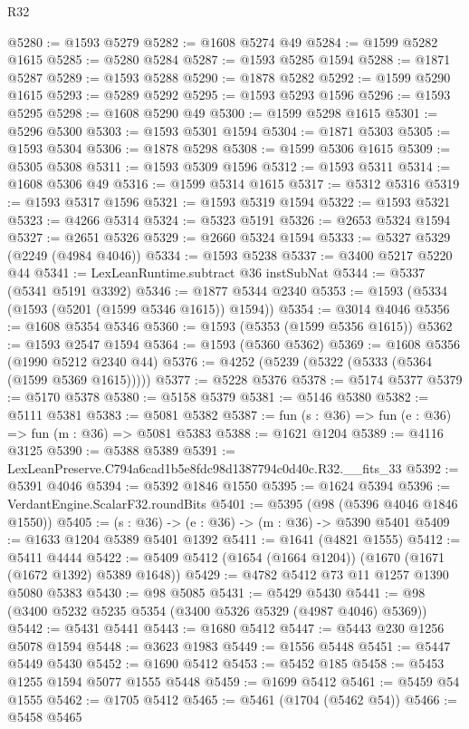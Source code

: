 \begin{lexlean}{R32}
\begin{coremodule}
@5280 := @1593 @5279
@5282 := @1608 @5274 @49
@5284 := @1599 @5282 @1615
@5285 := @5280 @5284
@5287 := @1593 @5285 @1594
@5288 := @1871 @5287
@5289 := @1593 @5288
@5290 := @1878 @5282
@5292 := @1599 @5290 @1615
@5293 := @5289 @5292
@5295 := @1593 @5293 @1596
@5296 := @1593 @5295
@5298 := @1608 @5290 @49
@5300 := @1599 @5298 @1615
@5301 := @5296 @5300
@5303 := @1593 @5301 @1594
@5304 := @1871 @5303
@5305 := @1593 @5304
@5306 := @1878 @5298
@5308 := @1599 @5306 @1615
@5309 := @5305 @5308
@5311 := @1593 @5309 @1596
@5312 := @1593 @5311
@5314 := @1608 @5306 @49
@5316 := @1599 @5314 @1615
@5317 := @5312 @5316
@5319 := @1593 @5317 @1596
@5321 := @1593 @5319 @1594
@5322 := @1593 @5321
@5323 := @4266 @5314
@5324 := @5323 @5191
@5326 := @2653 @5324 @1594
@5327 := @2651 @5326
@5329 := @2660 @5324 @1594
@5333 := @5327 @5329 (@2249 (@4984 @4046))
@5334 := @1593 @5238
@5337 := @3400 @5217 @5220 @44
@5341 := LexLeanRuntime.subtract @36 instSubNat
@5344 := @5337 (@5341 @5191 @3392)
@5346 := @1877 @5344 @2340
@5353 := @1593 (@5334 (@1593 (@5201 (@1599 @5346 @1615)) @1594))
@5354 := @3014 @4046
@5356 := @1608 @5354 @5346
@5360 := @1593 (@5353 (@1599 @5356 @1615))
@5362 := @1593 @2547 @1594
@5364 := @1593 (@5360 @5362)
@5369 := @1608 @5356 (@1990 @5212 @2340 @44)
@5376 := @4252 (@5239 (@5322 (@5333 (@5364 (@1599 @5369 @1615)))))
@5377 := @5228 @5376
@5378 := @5174 @5377
@5379 := @5170 @5378
@5380 := @5158 @5379
@5381 := @5146 @5380
@5382 := @5111 @5381
@5383 := @5081 @5382
@5387 := fun (s : @36) => fun (e : @36) => fun (m : @36) => @5081 @5383
@5388 := @1621 @1204
@5389 := @4116 @3125
@5390 := @5388 @5389
@5391 := LexLeanPreserve.C794a6cad1b5e8fdc98d1387794c0d40c.R32.__fits_33
@5392 := @5391 @4046
@5394 := @5392 @1846 @1550
@5395 := @1624 @5394
@5396 := VerdantEngine.ScalarF32.roundBits
@5401 := @5395 (@98 (@5396 @4046 @1846 @1550))
@5405 := (s : @36) -> (e : @36) -> (m : @36) -> @5390 @5401
@5409 := @1633 @1204 @5389 @5401 @1392
@5411 := @1641 (@4821 @1555)
@5412 := @5411 @4444
@5422 := @5409 @5412 (@1654 (@1664 @1204)) (@1670 (@1671 (@1672 @1392) @5389 @1648))
@5429 := @4782 @5412 @73 @11 @1257 @1390 @5080 @5383
@5430 := @98 @5085
@5431 := @5429 @5430
@5441 := @98 (@3400 @5232 @5235 @5354 (@3400 @5326 @5329 (@4987 @4046) @5369))
@5442 := @5431 @5441
@5443 := @1680 @5412
@5447 := @5443 @230 @1256 @5078 @1594
@5448 := @3623 @1983
@5449 := @1556 @5448
@5451 := @5447 @5449 @5430
@5452 := @1690 @5412
@5453 := @5452 @185
@5458 := @5453 @1255 @1594 @5077 @1555 @5448
@5459 := @1699 @5412
@5461 := @5459 @54 @1555
@5462 := @1705 @5412
@5465 := @5461 (@1704 (@5462 @54))
@5466 := @5458 @5465

\end{coremodule}
\end{lexlean}
